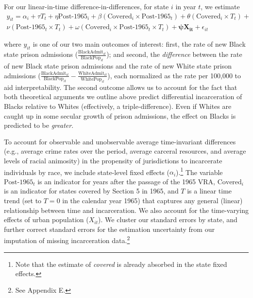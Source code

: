 \documentclass[12pt]{article}
\begin{document}
For our linear-in-time difference-in-differences, for state $i$ in year $t$, we estimate
\begin{align}
     y_{it} = \alpha_{i} + \tau T_{t} + \eta \text{Post-1965}_{i} + \beta  (\text{Covered}_{i} \times \text{Post-1965}_{t}) + \theta (\text{Covered}_{i} \times T_{t}) + \nonumber \\
      \nu (\text{Post-1965}_{t} \times T_{t}) + \omega (\text{Covered}_{i} \times \text{Post-1965}_{t} \times T_{t}) + \boldsymbol{\psi X_{it}}  + \epsilon_{it}  \label{equation_dind_linear}
\end{align}

where $y_{it}$ is one of our two main outcomes of interest: first, the rate of new Black state prison admissions ($\frac{\text{BlackAdmit}_{it}}{\text{BlackPop}_{it}}$); and second, the \emph{difference} between the rate of new Black state prison admissions and the rate of new White state prison admissions ($\frac{\text{BlackAdmit}_{it}}{\text{BlackPop}_{it}} - \frac{\text{WhiteAdmit}_{it}}{\text{WhitePop}_{it}}$), each normalized as the rate per 100,000 to aid interpretability. The second outcome allows us to account for the fact that both theoretical arguments we outline above predict differential incarceration of Blacks relative to Whites (effectively, a triple-difference).  Even if Whites are caught up in some secular growth of prison admissions, the effect on Blacks is predicted to be \emph{greater}.

To account for observable and unobservable average time-invariant differences (e.g., average crime rates over the period, average carceral resources, and average levels of racial animosity) in the propensity of jurisdictions to incarcerate individuals by race, we include state-level fixed effects ($\alpha_{i}$).\footnote{Note that the estimate of \emph{covered} is already absorbed in the state fixed effects.}  The variable $\text{Post-1965}_{t}$ is an indicator for years after the passage of the 1965 VRA, $\text{Covered}_{i}$ is an indicator for states covered by Section 5 in 1965, and $T$ is a linear time trend (set to $T=0$ in the calendar year 1965) that captures any general (linear) relationship between time and incarceration.  We also account for the time-varying effects of urban population ($X_{it}$).  We cluster our standard errors by state, and further correct standard errors for the estimation uncertainty from our imputation of missing incarceration data.\footnote{See Appendix E.}
\end{document}
